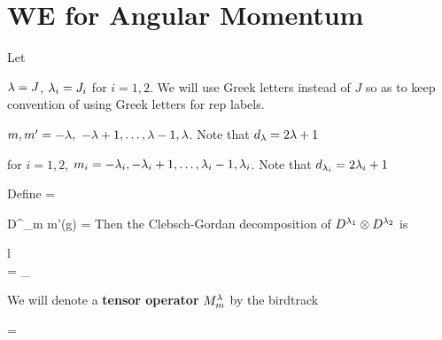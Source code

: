 \section{WE for Angular Momentum}
Let

$\lambda=J$, $\lambda_i=J_i$ for $i=1,2$.
We will use Greek letters instead of $J$
so as to keep
convention
of using Greek
letters for rep labels. 

$m, m'= -\lambda, \
-\lambda+1,\ldots, \lambda-1, \lambda$. Note that
$d_\lambda = 2\lambda + 1$
 
for $i=1,2$, $m_i= -\lambda_i, -\lambda_i +1,\ldots, \lambda_i-1, \lambda_i$.  Note
that
$d_{\lambda_i} = 2\lambda_i + 1$ 



Define
\beq
{}
\quad
=\quad
\bcen
{}
\ecen
\eeq

\beq
D^\lam_{m m'}(g)
\quad =\quad
{}
\eeq
Then
the Clebsch-Gordan decomposition of $D^{\lambda_1}\otimes D^{\lambda_2}$ is

\beq
\begin{array}{l}
\\
\bcen
{}
\ecen
=
\sum_\lam
\bcen
{}
\ecen
\end{array}
\eeq

We will denote a
{\bf tensor operator} $M^\lambda_m$ by
the birdtrack

\beq
{}
=
\bcen
{}
\ecen
\eeq

